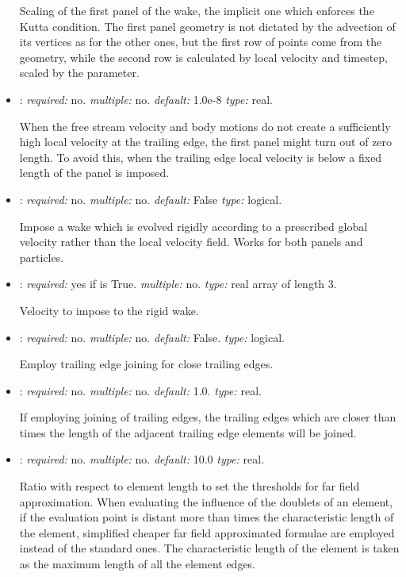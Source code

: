 \begin{itemize}
Scaling of the first panel of the wake, the implicit one which enforces the Kutta condition. The first panel geometry is not dictated by the advection of its vertices as for the other ones, but the first row of points come from the geometry, while the second row is calculated by local velocity and timestep, scaled by the  parameter.


\item {}: \textit{required:} no. \textit{multiple:} no. \textit{default:} 1.0e-8 \textit{type:} real.

When the free stream velocity and body motions do not create a sufficiently high local velocity at the trailing edge, the first panel might turn out of zero length. To avoid this, when the trailing edge local velocity is below  a fixed length of the panel is imposed.

\item {}: \textit{required:} no. \textit{multiple:} no. \textit{default:} False \textit{type:} logical.

Impose a wake which is evolved rigidly according to a prescribed global velocity rather than the local velocity field. Works for both panels and particles.

\item {}: \textit{required:} yes if  is True. \textit{multiple:} no. \textit{type:} real array of length 3.

Velocity to impose to the rigid wake.

\item {}: \textit{required:} no. \textit{multiple:} no. \textit{default:} False. \textit{type:} logical.

Employ trailing edge joining for close trailing edges.

\item {}: \textit{required:} no. \textit{multiple:} no. \textit{default:} 1.0. \textit{type:} real.

If employing joining of trailing edges, the trailing edges which are closer than  times the length of the adjacent trailing edge elements will be joined. 

\item {}: \textit{required:} no. \textit{multiple:} no. \textit{default:} 10.0 \textit{type:} real.

Ratio with respect to element length to set the thresholds for far field approximation. When evaluating the influence of the doublets of an element, if the evaluation point is distant more than  times the characteristic length of the element, simplified cheaper far field approximated formulae are employed instead of the standard ones. The characteristic length of the element is taken as the maximum length of all the element edges.


\end{itemize}
